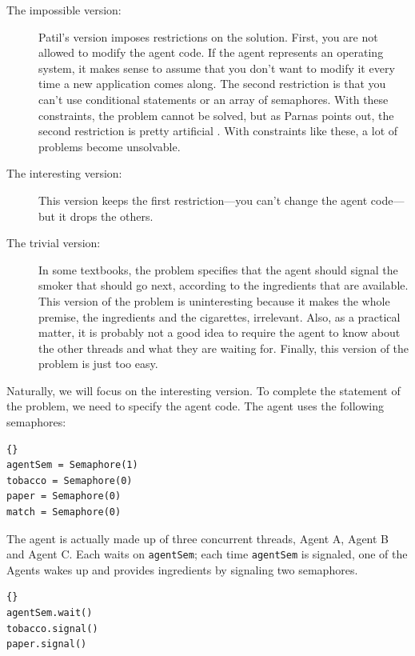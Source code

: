 \documentclass{book}
\begin{document}
\begin{description}

\item[The impossible version:] Patil's version imposes restrictions on
the solution.  First, you are not allowed to modify the agent code.
If the agent represents an operating system, it makes sense to assume
that you don't want to modify it every time a new application comes
along.  The second restriction is that you can't use conditional
statements or an array of semaphores.  With these constraints, the
problem cannot be solved, but as Parnas points out, the second
restriction is pretty artificial \cite{Parnas}.  With constraints like
these, a lot of problems become unsolvable.

\item[The interesting version:] This version keeps the first
restriction---you can't change the agent code---but it drops the others.

\item[The trivial version:] In some textbooks, the problem specifies
that the agent should signal the smoker that should go next, according
to the ingredients that are available.  This version of the problem
is uninteresting because it makes the whole premise, the ingredients
and the cigarettes, irrelevant.  Also, as a practical matter, it is
probably not a good idea to require the agent to know about the other
threads and what they are waiting for.  Finally, this version of
the problem is just too easy.

\end{description}

Naturally, we will focus on the interesting version.  To complete
the statement of the problem, we need to specify the agent code.
The agent uses the following semaphores:

\begin{lstlisting}[caption={Agent semaphores}]{}
agentSem = Semaphore(1)
tobacco = Semaphore(0)
paper = Semaphore(0)
match = Semaphore(0)
\end{lstlisting}

The agent is actually made up of three concurrent
threads, Agent A, Agent B and Agent C.  Each waits on
{\tt agentSem}; each time {\tt agentSem} is signaled,
one of the Agents wakes up and provides ingredients by
signaling two semaphores.

\begin{lstlisting}[caption={Agent A code}]{}
agentSem.wait()
tobacco.signal()
paper.signal()
\end{lstlisting}
\end{document}
